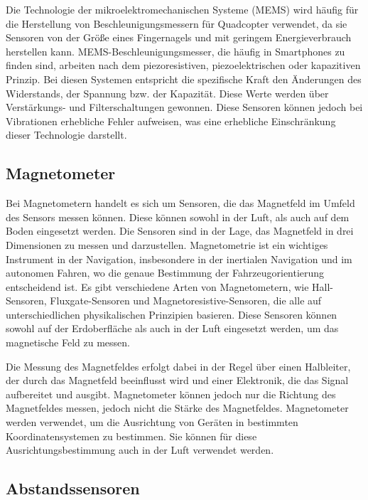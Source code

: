          Die Technologie der mikroelektromechanischen Systeme (MEMS) wird häufig für die Herstellung von Beschleunigungsmessern für Quadcopter verwendet, da sie Sensoren von der Größe eines Fingernagels und mit geringem Energieverbrauch herstellen kann. MEMS-Beschleunigungsmesser, die häufig in Smartphones zu finden sind, arbeiten nach dem piezoresistiven, piezoelektrischen oder kapazitiven Prinzip. Bei diesen Systemen entspricht die spezifische Kraft den Änderungen des Widerstands, der Spannung bzw. der Kapazität. Diese Werte werden über Verstärkungs- und Filterschaltungen gewonnen. Diese Sensoren können jedoch bei Vibrationen erhebliche Fehler aufweisen, was eine erhebliche Einschränkung dieser Technologie darstellt. 

    \cite[vgl.][S. 149-155]{SWB-165930377X}
    \subsection{Magnetometer} \label{magnetometer:subsection}

    Bei Magnetometern handelt es sich um Sensoren, die das Magnetfeld im Umfeld des Sensors messen können.
    Diese können sowohl in der Luft, als auch auf dem Boden eingesetzt werden.
    Die Sensoren sind in der Lage, das Magnetfeld in drei Dimensionen zu messen und darzustellen.
    Magnetometrie ist ein wichtiges Instrument in der Navigation, insbesondere in der inertialen Navigation und im autonomen Fahren, wo die genaue Bestimmung der Fahrzeugorientierung entscheidend ist. Es gibt verschiedene Arten von Magnetometern, wie Hall-Sensoren, Fluxgate-Sensoren und Magnetoresistive-Sensoren, die alle auf unterschiedlichen physikalischen Prinzipien basieren. Diese Sensoren können sowohl auf der Erdoberfläche als auch in der Luft eingesetzt werden, um das magnetische Feld zu messen.

    Die Messung des Magnetfeldes erfolgt dabei in der Regel über einen Halbleiter, der durch das Magnetfeld beeinflusst wird und einer Elektronik, die das Signal aufbereitet und ausgibt.
    Magnetometer können jedoch nur die Richtung des Magnetfeldes messen, jedoch nicht die Stärke des Magnetfeldes.
    Magnetometer werden verwendet, um die Ausrichtung von Geräten in bestimmten Koordinatensystemen zu bestimmen.
    Sie können für diese Ausrichtungsbestimmung auch in der Luft verwendet werden. 

    \cite[vgl.][S. 155]{SWB-165930377X}
 
    \subsection{Abstandssensoren} \label{abstandssensoren:subsection}

